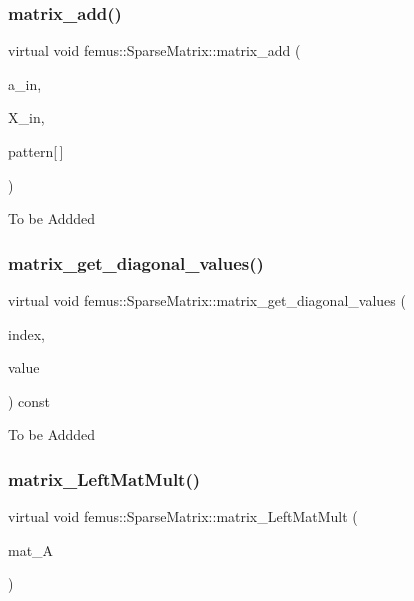 \subsubsection{\texorpdfstring{matrix\+\_\+add()}{matrix\_add()}}
{\footnotesize\ttfamily virtual void femus\+::\+Sparse\+Matrix\+::matrix\+\_\+add (\begin{DoxyParamCaption}\item[{const double}]{a\+\_\+in,  }\item[{\mbox{\hyperlink{classfemus_1_1_sparse_matrix}{Sparse\+Matrix}} \&}]{X\+\_\+in,  }\item[{const char}]{pattern\mbox{[}$\,$\mbox{]} }\end{DoxyParamCaption})\hspace{0.3cm}{\ttfamily [pure virtual]}}

To be Addded \mbox{\label{classfemus_1_1_sparse_matrix_a1f224c61d45050fc66e99dc2958abc70}} 
\subsubsection{\texorpdfstring{matrix\+\_\+get\+\_\+diagonal\+\_\+values()}{matrix\_get\_diagonal\_values()}}
{\footnotesize\ttfamily virtual void femus\+::\+Sparse\+Matrix\+::matrix\+\_\+get\+\_\+diagonal\+\_\+values (\begin{DoxyParamCaption}\item[{const std\+::vector$<$ int $>$ \&}]{index,  }\item[{std\+::vector$<$ double $>$ \&}]{value }\end{DoxyParamCaption}) const\hspace{0.3cm}{\ttfamily [pure virtual]}}

To be Addded \mbox{\label{classfemus_1_1_sparse_matrix_a3e1f15fab373572ab98205ca5b115815}} 
\subsubsection{\texorpdfstring{matrix\+\_\+\+Left\+Mat\+Mult()}{matrix\_LeftMatMult()}}
{\footnotesize\ttfamily virtual void femus\+::\+Sparse\+Matrix\+::matrix\+\_\+\+Left\+Mat\+Mult (\begin{DoxyParamCaption}\item[{const \mbox{\hyperlink{classfemus_1_1_sparse_matrix}{Sparse\+Matrix}} \&}]{mat\+\_\+A }\end{DoxyParamCaption})\hspace{0.3cm}{\ttfamily [pure virtual]}}

